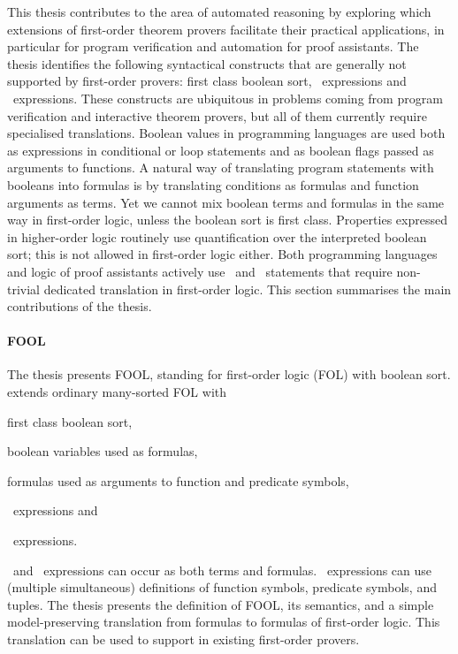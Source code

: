 This thesis contributes to the area of automated reasoning by exploring which extensions of first-order theorem provers facilitate their practical applications, in particular for program verification and automation for proof assistants. The thesis identifies the following syntactical constructs that are generally not supported by first-order provers: first class boolean sort, \ITE\ expressions and \LETIN\ expressions. These constructs are ubiquitous in problems coming from program verification and interactive theorem provers, but all of them currently require specialised translations. Boolean values in programming languages are used both as expressions in conditional or loop statements and as boolean flags passed as arguments to functions. A natural way of translating program statements with booleans into formulas is by translating conditions as formulas and function arguments as terms. Yet we cannot mix boolean terms and formulas in the same way in first-order logic, unless the boolean sort is first class. Properties expressed in higher-order logic routinely use quantification over the interpreted boolean sort; this is not allowed in first-order logic either. Both programming languages and logic of proof assistants actively use \ITE\ and \LETIN\ statements that require non-trivial dedicated translation in first-order logic. This section summarises the main contributions of the thesis.

\paragraph{FOOL}
The thesis presents FOOL, standing for first-order logic (FOL) with boolean sort. \folb{} extends ordinary many-sorted FOL with \begin{enumerate*}[label=(\roman*)]\item first class boolean sort, \item boolean variables used as formulas, \item formulas used as arguments to function and predicate symbols, \item \ITE\ expressions and \item \LETIN\ expressions.\end{enumerate*} \ITE\ and \LETIN\ expressions can occur as both terms and formulas. \LETIN\ expressions can use (multiple simultaneous) definitions of function symbols, predicate symbols, and tuples. The thesis presents the definition of FOOL, its semantics, and a simple model-preserving translation from \folb{} formulas to formulas of first-order logic. This translation can be used to support \folb{} in existing first-order provers.

